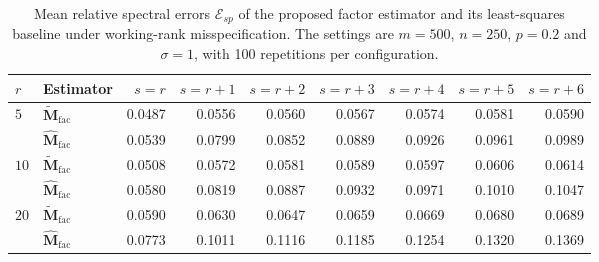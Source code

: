 \documentclass[numsec,webpdf,modern,large,namedate]{oup-authoring-template}
\theoremstyle{plain}
\theoremstyle{remark}
\newcommand{\M}{\bm{M}}
\begin{document}
\begin{table}[!htbp]
\centering
\caption{Mean relative spectral errors $\mathcal E_{sp}$ of the proposed factor estimator and its least-squares baseline under working-rank misspecification. The settings are $m=500$, $n=250$, $p=0.2$ and $\sigma=1$, with 100 repetitions per configuration.}
\label{tab:supp:misrank_specnorm}
\begingroup
\small
{}
\setlength{\tabcolsep}{3.2pt}
\begin{tabular}{@{}llrrrrrrr@{}}
\toprule
$r$ & Estimator & $s=r$ & $s=r+1$ & $s=r+2$ & $s=r+3$ & $s=r+4$ & $s=r+5$ & $s=r+6$ \\
\midrule
\multirow{2}{*}{$5$} & $\widetilde{\M}_{\mathrm{fac}}$ & 0.0487 & 0.0556 & 0.0560 & 0.0567 & 0.0574 & 0.0581 & 0.0590 \\
 & $\widehat{\M}_{\mathrm{fac}}$ & 0.0539 & 0.0799 & 0.0852 & 0.0889 & 0.0926 & 0.0961 & 0.0989 \\
\midrule
\multirow{2}{*}{$10$} & $\widetilde{\M}_{\mathrm{fac}}$ & 0.0508 & 0.0572 & 0.0581 & 0.0589 & 0.0597 & 0.0606 & 0.0614 \\
 & $\widehat{\M}_{\mathrm{fac}}$ & 0.0580 & 0.0819 & 0.0887 & 0.0932 & 0.0971 & 0.1010 & 0.1047 \\
\midrule
\multirow{2}{*}{$20$} & $\widetilde{\M}_{\mathrm{fac}}$ & 0.0590 & 0.0630 & 0.0647 & 0.0659 & 0.0669 & 0.0680 & 0.0689 \\
 & $\widehat{\M}_{\mathrm{fac}}$ & 0.0773 & 0.1011 & 0.1116 & 0.1185 & 0.1254 & 0.1320 & 0.1369 \\
\bottomrule
\end{tabular}
\endgroup
\end{table}
\end{document}
